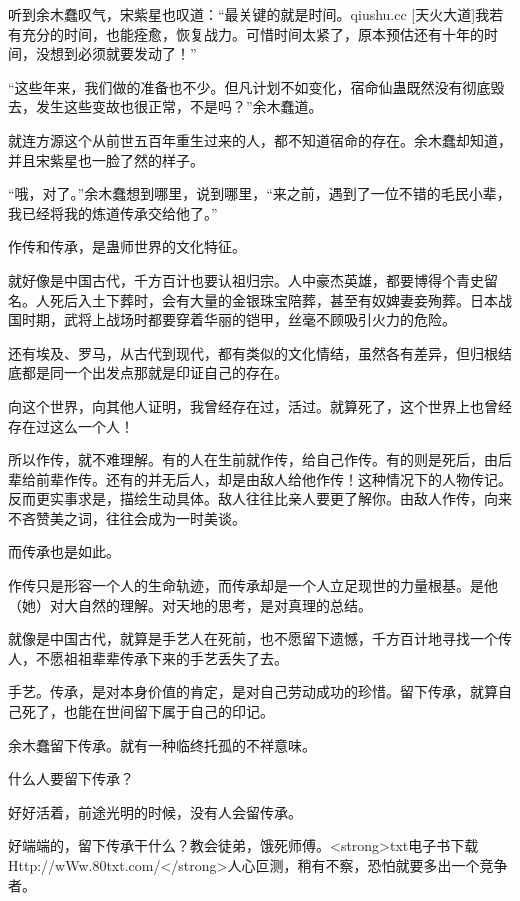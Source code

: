 
\begin{this_body}

听到余木蠢叹气，宋紫星也叹道：“最关键的就是时间。qiushu.cc [天火大道]我若有充分的时间，也能痊愈，恢复战力。可惜时间太紧了，原本预估还有十年的时间，没想到必须就要发动了！”

“这些年来，我们做的准备也不少。但凡计划不如变化，宿命仙蛊既然没有彻底毁去，发生这些变故也很正常，不是吗？”余木蠢道。

就连方源这个从前世五百年重生过来的人，都不知道宿命的存在。余木蠢却知道，并且宋紫星也一脸了然的样子。

“哦，对了。”余木蠢想到哪里，说到哪里，“来之前，遇到了一位不错的毛民小辈，我已经将我的炼道传承交给他了。”

作传和传承，是蛊师世界的文化特征。

就好像是中国古代，千方百计也要认祖归宗。人中豪杰英雄，都要博得个青史留名。人死后入土下葬时，会有大量的金银珠宝陪葬，甚至有奴婢妻妾殉葬。日本战国时期，武将上战场时都要穿着华丽的铠甲，丝毫不顾吸引火力的危险。

还有埃及、罗马，从古代到现代，都有类似的文化情结，虽然各有差异，但归根结底都是同一个出发点那就是印证自己的存在。

向这个世界，向其他人证明，我曾经存在过，活过。就算死了，这个世界上也曾经存在过这么一个人！

所以作传，就不难理解。有的人在生前就作传，给自己作传。有的则是死后，由后辈给前辈作传。还有的并无后人，却是由敌人给他作传！这种情况下的人物传记。反而更实事求是，描绘生动具体。敌人往往比亲人要更了解你。由敌人作传，向来不吝赞美之词，往往会成为一时美谈。

而传承也是如此。

作传只是形容一个人的生命轨迹，而传承却是一个人立足现世的力量根基。是他（她）对大自然的理解。对天地的思考，是对真理的总结。

就像是中国古代，就算是手艺人在死前，也不愿留下遗憾，千方百计地寻找一个传人，不愿祖祖辈辈传承下来的手艺丢失了去。

手艺。传承，是对本身价值的肯定，是对自己劳动成功的珍惜。留下传承，就算自己死了，也能在世间留下属于自己的印记。

余木蠢留下传承。就有一种临终托孤的不祥意味。

什么人要留下传承？

好好活着，前途光明的时候，没有人会留传承。

好端端的，留下传承干什么？教会徒弟，饿死师傅。<strong>txt电子书下载Http://wWw.80txt.com/</strong>人心叵测，稍有不察，恐怕就要多出一个竞争者。


\end{this_body}
